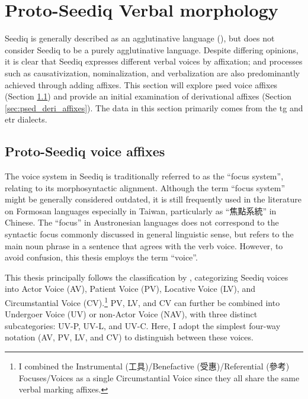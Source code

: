 \section{Proto-Seediq Verbal morphology} \label{sec:psed_aff}

Seediq is generally described as an agglutinative language (\cite{tsukida2012}), but \textcite{holmer1996parametric} does not consider Seediq to be a purely agglutinative language. Despite differing opinions, it is clear that Seediq expresses different verbal voices by affixation; and processes such as causativization, nominalization, and verbalization are also predominantly achieved through adding affixes. This section will explore \acl{psed} voice affixes (Section \ref{sec:psed_voice_affixes}) and provide an initial examination of derivational affixes (Section \ref{sec:psed_deri_affixes}). The data in this section primarily comes from the \acl{tg} and \acl{etr} dialects.

\subsection{Proto-Seediq voice affixes} \label{sec:psed_voice_affixes}

The voice system in Seediq is traditionally referred to as the ``focus system'', relating to its morphosyntactic alignment. Although the term ``focus system'' might be generally considered outdated, it is still frequently used in the literature on Formosan languages especially in Taiwan, particularly as ``焦點系統'' in Chinese. The ``focus'' in Austronesian languages does not correspond to the syntactic focus commonly discussed in general linguistic sense, but refers to the main noun phrase in a sentence that agrees with the verb voice. However, to avoid confusion, this thesis employs the term ``voice''.

This thesis principally follows the classification by \textcite{Sung2018Sedgrammar,Lee2018Trugrammar}, categorizing Seediq voices into Actor Voice (AV), Patient Voice (PV), Locative Voice (LV), and Circumstantial Voice (CV).\footnote{I combined the Instrumental (工具)/Benefactive (受惠)/Referential (參考) Focuses/Voices as a single Circumstantial Voice since they all share the same verbal marking affixes.} PV, LV, and CV can further be combined into Undergoer Voice (UV) or non-Actor Voice (NAV), with three distinct subcategories: UV-P, UV-L, and UV-C. Here, I adopt the simplest four-way notation (AV, PV, LV, and CV) to distinguish between these voices.

